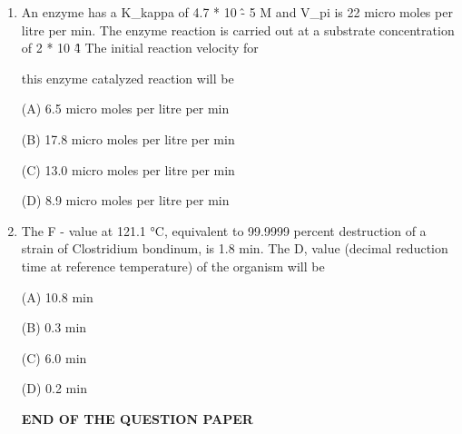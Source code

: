 \documentclass[journal]{IEEEtran}
\begin{document}
\begin{enumerate}
{(A) 2.08kg / min

(B) 5.33kg / min

(C) 3.33 kg/min

D) 2.93kg / min
}
\item {An enzyme has a K\_{kappa} of 4.7 * 10 \^ - 5 M and V\_{pi} is 22 micro moles per litre per min. The enzyme reaction is carried out at a substrate concentration of 2 * 10 \^ 4 The initial reaction velocity for

this enzyme catalyzed reaction will be

(A) 6.5 micro moles per litre per min

(B) 17.8 micro moles per litre per min

(C) 13.0 micro moles per litre per min

(D) 8.9 micro moles per litre per min
}
\item {The F - value at 121.1 °C, equivalent to 99.9999 percent destruction of a strain of Clostridium bondinum, is 1.8 min. The D, value (decimal reduction time at reference temperature) of the organism will be

(A) 10.8 min

(B) 0.3 min

(C) 6.0 min

(D) 0.2 min
}\newline
\begin{center}
\textbf{END OF THE QUESTION PAPER}
\end{center}


\end{enumerate}
\end{document}
